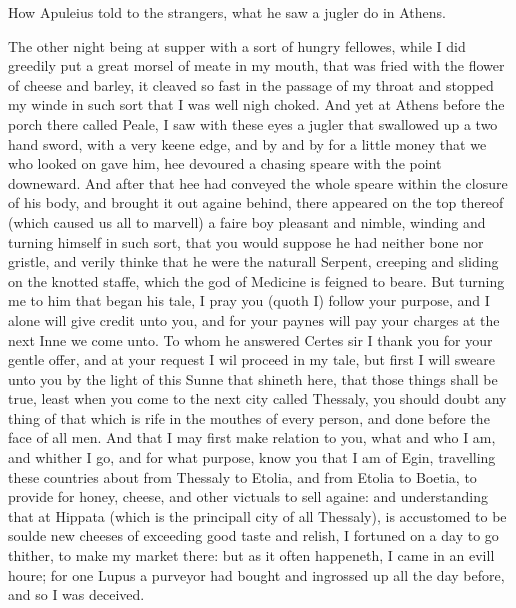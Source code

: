 
How Apuleius told to the strangers, what he saw a jugler do in Athens.

The other night being at supper with a sort of hungry fellowes, while I did
greedily put a great morsel of meate in my mouth, that was fried with the
flower of cheese and barley, it cleaved so fast in the passage of my throat and
stopped my winde in such sort that I was well nigh choked. And yet at Athens
before the porch there called Peale, I saw with these eyes a jugler that
swallowed up a two hand sword, with a very keene edge, and by and by for a
little money that we who looked on gave him, hee devoured a chasing speare with
the point downeward. And after that hee had conveyed the whole speare within
the closure of his body, and brought it out againe behind, there appeared on
the top thereof (which caused us all to marvell) a faire boy pleasant and
nimble, winding and turning himself in such sort, that you would suppose he had
neither bone nor gristle, and verily thinke that he were the naturall Serpent,
creeping and sliding on the knotted staffe, which the god of Medicine is
feigned to beare. But turning me to him that began his tale, I pray you (quoth
I) follow your purpose, and I alone will give credit unto you, and for your
paynes will pay your charges at the next Inne we come unto. To whom he answered
Certes sir I thank you for your gentle offer, and at your request I wil proceed
in my tale, but first I will sweare unto you by the light of this Sunne that
shineth here, that those things shall be true, least when you come to the next
city called Thessaly, you should doubt any thing of that which is rife in the
mouthes of every person, and done before the face of all men. And that I may
first make relation to you, what and who I am, and whither I go, and for what
purpose, know you that I am of Egin, travelling these countries about from
Thessaly to Etolia, and from Etolia to Boetia, to provide for honey, cheese,
and other victuals to sell againe: and understanding that at Hippata (which is
the principall city of all Thessaly), is accustomed to be soulde new cheeses of
exceeding good taste and relish, I fortuned on a day to go thither, to make my
market there: but as it often happeneth, I came in an evill houre; for one
Lupus a purveyor had bought and ingrossed up all the day before, and so I was
deceived.

